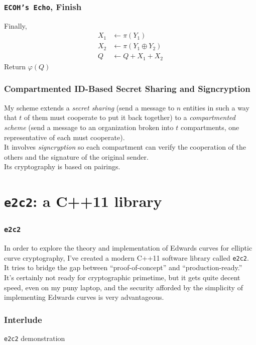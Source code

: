 \documentclass[xcolor=dvipsnames, handout]{beamer}
\begin{document}
\begin{frame}
    \frametitle{\texttt{ECOH's Echo}, Finish}
    Finally,
    \begin{align*}
        X_1 &\gets \pi(Y_1)\\
        X_2 &\gets \pi\left(Y_1 \oplus Y_2\right)\\
        Q &\gets Q + X_1 + X_2
    \end{align*}
    Return $\varphi(Q)$
\end{frame}

\begin{frame}
    \frametitle{Compartmented ID-Based Secret Sharing and Signcryption}
    My scheme extends a \textit{secret sharing} (send a message to $n$ entities
        in such a way that $t$ of them must cooperate to put it back together)
        to a \textit{compartmented scheme} (send a message to an organization
        broken into $t$ compartments, one representative of each must
        cooperate).\\
    \pause
    It involves \textit{signcryption} so each compartment can verify the
        cooperation of the others and the signature of the original sender.\\
    \pause
    Its cryptography is based on pairings.
\end{frame}

\section{\texttt{e2c2}: a C++11 library}

\begin{frame}
    \frametitle{\texttt{e2c2}}
    In order to explore the theory and implementation of Edwards curves for
        elliptic curve cryptography, I've created a modern C++11 software
        library called \texttt{e2c2}.\\
    It tries to bridge the gap between ``proof-of-concept'' and
        ``production-ready.''\\
    It's certainly not ready for cryptographic primetime, but it gets quite
        decent speed, even on my puny laptop, and the security afforded by the
        simplicity of implementing Edwards curves is very advantageous.
\end{frame}

\begin{frame}
    \frametitle{Interlude}
    \texttt{e2c2} demonstration
\end{frame}
\end{document}
